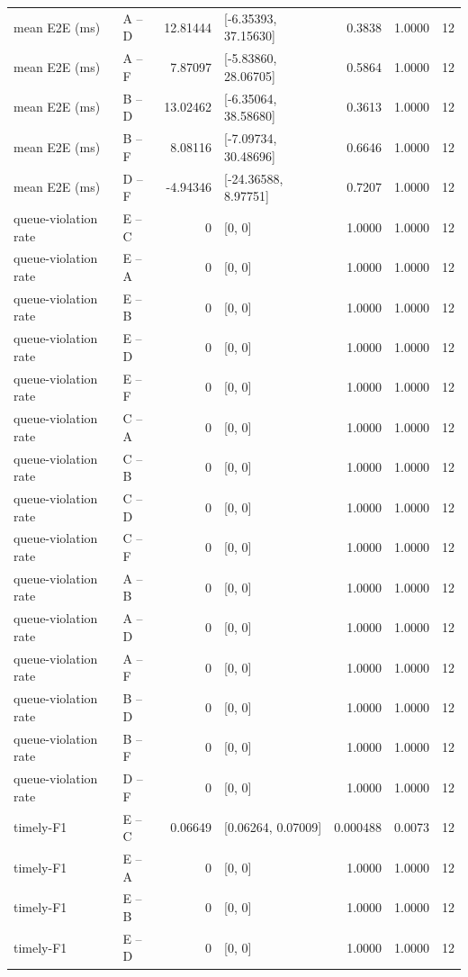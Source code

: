 \documentclass[10pt]{article}
\begin{document}
\begin{longtable}{@{}p{}p{}r p{}rrr@{}}
mean E2E (ms) & A -- D & 12.81444 & [-6.35393, 37.15630] & 0.3838 & 1.0000 & 12 \\
mean E2E (ms) & A -- F & 7.87097 & [-5.83860, 28.06705] & 0.5864 & 1.0000 & 12 \\
mean E2E (ms) & B -- D & 13.02462 & [-6.35064, 38.58680] & 0.3613 & 1.0000 & 12 \\
mean E2E (ms) & B -- F & 8.08116 & [-7.09734, 30.48696] & 0.6646 & 1.0000 & 12 \\
mean E2E (ms) & D -- F & -4.94346 & [-24.36588, 8.97751] & 0.7207 & 1.0000 & 12 \\
queue-violation rate & E -- C & 0 & [0, 0] & 1.0000 & 1.0000 & 12 \\
queue-violation rate & E -- A & 0 & [0, 0] & 1.0000 & 1.0000 & 12 \\
queue-violation rate & E -- B & 0 & [0, 0] & 1.0000 & 1.0000 & 12 \\
queue-violation rate & E -- D & 0 & [0, 0] & 1.0000 & 1.0000 & 12 \\
queue-violation rate & E -- F & 0 & [0, 0] & 1.0000 & 1.0000 & 12 \\
queue-violation rate & C -- A & 0 & [0, 0] & 1.0000 & 1.0000 & 12 \\
queue-violation rate & C -- B & 0 & [0, 0] & 1.0000 & 1.0000 & 12 \\
queue-violation rate & C -- D & 0 & [0, 0] & 1.0000 & 1.0000 & 12 \\
queue-violation rate & C -- F & 0 & [0, 0] & 1.0000 & 1.0000 & 12 \\
queue-violation rate & A -- B & 0 & [0, 0] & 1.0000 & 1.0000 & 12 \\
queue-violation rate & A -- D & 0 & [0, 0] & 1.0000 & 1.0000 & 12 \\
queue-violation rate & A -- F & 0 & [0, 0] & 1.0000 & 1.0000 & 12 \\
queue-violation rate & B -- D & 0 & [0, 0] & 1.0000 & 1.0000 & 12 \\
queue-violation rate & B -- F & 0 & [0, 0] & 1.0000 & 1.0000 & 12 \\
queue-violation rate & D -- F & 0 & [0, 0] & 1.0000 & 1.0000 & 12 \\
timely-F1 & E -- C & 0.06649 & [0.06264, 0.07009] & 0.000488 & 0.0073 & 12 \\
timely-F1 & E -- A & 0 & [0, 0] & 1.0000 & 1.0000 & 12 \\
timely-F1 & E -- B & 0 & [0, 0] & 1.0000 & 1.0000 & 12 \\
timely-F1 & E -- D & 0 & [0, 0] & 1.0000 & 1.0000 & 12 \\

\end{longtable}
\end{document}
